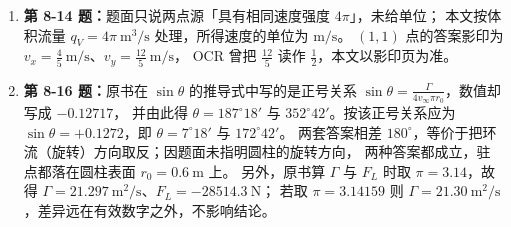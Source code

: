 \begin{tishi}
\begin{enumerate}[label=\arabic*.,leftmargin=1.8em,itemsep=2pt]
        第 (4) 小题题面为 $\psi=k\left(1-\frac{1}{r^2}\right)r\sin\theta$（即 $k\left(r-\frac{1}{r}\right)\sin\theta$），
        影印中指数 $2$ 很小、容易读成 $\frac{1}{r}$；只有按 $\frac{1}{r^2}$ 计算，才与原书
        「$v_r=k\left(1-\frac{1}{r^2}\right)\cos\theta$、$v_\theta=-k\left(1+\frac{1}{r^2}\right)\sin\theta$、
        无旋有势」的答案吻合，故题面按 $\frac{1}{r^2}$ 转写。
  \item \textbf{第 8-14 题：}题面只说两点源「具有相同速度强度 $4\pi$」，未给单位；
        本文按体积流量 $q_V=4\pi\ \mathrm{m^3/s}$ 处理，所得速度的单位为 $\mathrm{m/s}$。
        $(1,1)$ 点的答案影印为 $v_x=\frac{4}{5}\ \mathrm{m/s}$、$v_y=\frac{12}{5}\ \mathrm{m/s}$，
        OCR 曾把 $\frac{12}{5}$ 读作 $\frac{1}{2}$，本文以影印页为准。
  \item \textbf{第 8-16 题：}原书在 $\sin\theta$ 的推导式中写的是正号关系
        $\sin\theta=\frac{\Gamma}{4v_\infty\pi r_0}$，数值却写成 $-0.12717$，
        并由此得 $\theta=187^\circ18'$ 与 $352^\circ42'$。按该正号关系应为
        $\sin\theta=+0.1272$，即 $\theta=7^\circ18'$ 与 $172^\circ42'$。
        两套答案相差 $180^\circ$，等价于把环流（旋转）方向取反；因题面未指明圆柱的旋转方向，
        两种答案都成立，驻点都落在圆柱表面 $r_0=0.6\ \mathrm{m}$ 上。
        另外，原书算 $\Gamma$ 与 $F_L$ 时取 $\pi=3.14$，故得
        $\Gamma=21.297\ \mathrm{m^2/s}$、$F_L=-28514.3\ \mathrm{N}$；
        若取 $\pi=3.14159$ 则 $\Gamma=21.30\ \mathrm{m^2/s}$，差异远在有效数字之外，不影响结论。
\end{enumerate}
\end{tishi}

